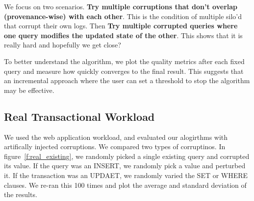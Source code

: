 We focus on two scenarios.  {\bf Try multiple corruptions that don't overlap (provenance-wise) with each other}.  This is the condition of multiple silo'd that
corrupt their own logs.  Then {\bf Try multiple corrupted queries where one query modifies the updated state of the other}.  This shows that
it is really hard and hopefully we get close?



To better understand the algorithm, we plot the quality metrics after each fixed query and measure how quickly \sys converges to the final result. 
This suggests that an incremental approach where the user can set a threshold to stop the algorithm may be effective.



\subsection{Real Transactional Workload}

We used the web application workload, and evaluated our alogirthms with artifically injected corruptions.
We compared two types of corruptinos.  In figure~\ref{f:real_existing}, we randomly picked a single existing 
query and corrupted its value.  If the query was an INSERT, we randomly pick a value and perturbed it.
If the transaction was an UPDAET, we randomly varied the SET or WHERE clauses.   We re-ran this
100 times and plot the average and standard deviation of the results.

